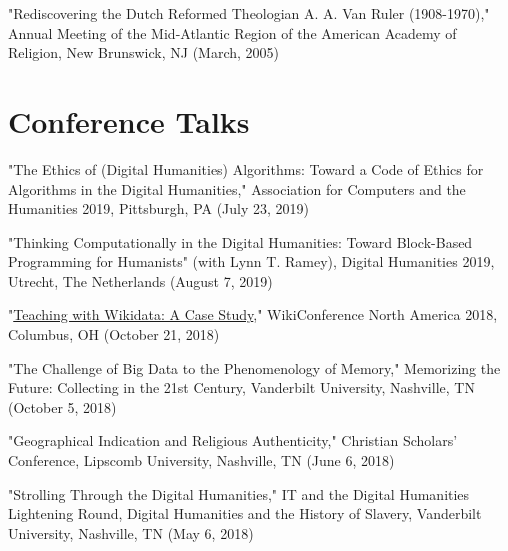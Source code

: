 \documentclass[10pt]{res} %
\begin{document}
\begin{resume}
\begin{hangparas}{.25in}{1}"Rediscovering the Dutch Reformed Theologian A. A. Van Ruler (1908-1970)," Annual Meeting of the Mid-Atlantic Region of the American Academy of Religion, New Brunswick, NJ (March, 2005)\end{hangparas}

\section{Conference Talks}

\begin{hangparas}{.25in}{1}"The Ethics of (Digital Humanities) Algorithms: Toward a Code of Ethics for Algorithms in the Digital Humanities," Association for Computers and the Humanities 2019, Pittsburgh, PA (July 23, 2019)\end{hangparas}

\begin{hangparas}{.25in}{1}"Thinking Computationally in the Digital Humanities: Toward Block-Based Programming for Humanists" (with Lynn T. Ramey), Digital Humanities 2019, Utrecht, The Netherlands (August 7, 2019)\end{hangparas}

\begin{hangparas}{.25in}{1}"\href{https://commons.wikimedia.org/wiki/File:Teaching_with_Wikidata-A_Case_Study.pdf}{Teaching with Wikidata: A Case Study}," WikiConference North America 2018, Columbus, OH (October 21, 2018)\end{hangparas}

\begin{hangparas}{.25in}{1}"The Challenge of Big Data to the Phenomenology of Memory," Memorizing the Future: Collecting in the 21st Century, Vanderbilt University, Nashville, TN (October 5, 2018)\end{hangparas}

\begin{hangparas}{.25in}{1}"Geographical Indication and Religious Authenticity," Christian Scholars’ Conference, Lipscomb University, Nashville, TN (June 6, 2018)\end{hangparas}

\begin{hangparas}{.25in}{1}"Strolling Through the Digital Humanities," IT and the Digital Humanities Lightening Round, Digital Humanities and the History of Slavery, Vanderbilt University, Nashville, TN (May 6, 2018)\end{hangparas}


\end{resume}
\end{document}
